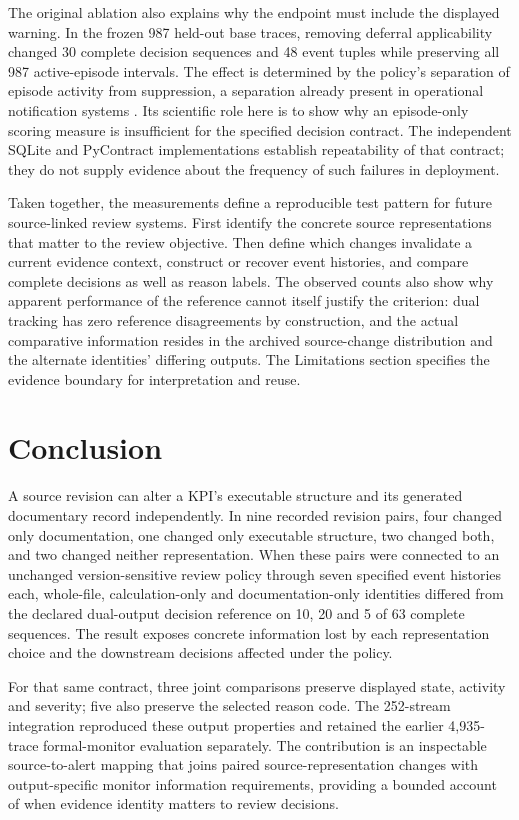 \documentclass[preprint,11pt]{elsarticle}
\begin{document}
The original ablation also explains why the endpoint must include the displayed warning. In the frozen 987 held-out base traces, removing deferral applicability changed 30 complete decision sequences and 48 event tuples while preserving all 987 active-episode intervals. The effect is determined by the policy's separation of episode activity from suppression, a separation already present in operational notification systems \cite{prometheus2026alertmanager}. Its scientific role here is to show why an episode-only scoring measure is insufficient for the specified decision contract. The independent SQLite and PyContract implementations establish repeatability of that contract; they do not supply evidence about the frequency of such failures in deployment.

Taken together, the measurements define a reproducible test pattern for future source-linked review systems. First identify the concrete source representations that matter to the review objective. Then define which changes invalidate a current evidence context, construct or recover event histories, and compare complete decisions as well as reason labels. The observed counts also show why apparent performance of the reference cannot itself justify the criterion: dual tracking has zero reference disagreements by construction, and the actual comparative information resides in the archived source-change distribution and the alternate identities' differing outputs. The Limitations section specifies the evidence boundary for interpretation and reuse.

\section{Conclusion}
A source revision can alter a KPI's executable structure and its generated documentary record independently. In nine recorded revision pairs, four changed only documentation, one changed only executable structure, two changed both, and two changed neither representation. When these pairs were connected to an unchanged version-sensitive review policy through seven specified event histories each, whole-file, calculation-only and documentation-only identities differed from the declared dual-output decision reference on 10, 20 and 5 of 63 complete sequences. The result exposes concrete information lost by each representation choice and the downstream decisions affected under the policy.

For that same contract, three joint comparisons preserve displayed state, activity and severity; five also preserve the selected reason code. The 252-stream integration reproduced these output properties and retained the earlier 4,935-trace formal-monitor evaluation separately. The contribution is an inspectable source-to-alert mapping that joins paired source-representation changes with output-specific monitor information requirements, providing a bounded account of when evidence identity matters to review decisions.
\end{document}
